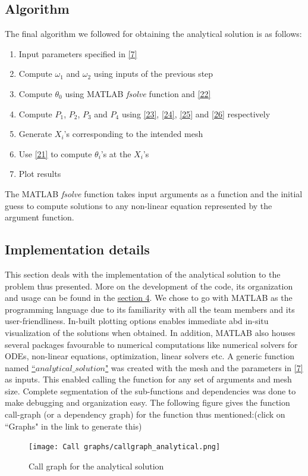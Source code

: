 \documentclass[12pt]{article}
\begin{document}
\subsection{Algorithm }
The final algorithm we followed for obtaining the analytical solution is as follows:
\begin{enumerate}
    \item Input parameters specified in \eqref{7}
    \item Compute $\omega_1$ and $\omega_2$ using inputs of the previous step
    \item Compute $\theta_0$ using MATLAB \emph{fsolve} function and \eqref{22}
    \item Compute $P_1$, $P_2$, $P_3$ and $P_4$ using \eqref{23}, \eqref{24}, \eqref{25} and \eqref{26} respectively
    \item Generate $X_i$'s corresponding to the intended mesh
    \item Use \eqref{21} to compute $\theta_i$'s at the $X_i$'s 
    \item Plot results
\end{enumerate}
The MATLAB \emph{fsolve} function takes input arguments as a function and the initial guess to compute solutions to any non-linear equation represented by the argument function. 
\subsection{Implementation details}
This section deals with the implementation of the analytical solution to the problem thus presented. More on the development of the code, its organization and usage can be found in the \hyperref[sec:Code]{section 4}. We chose to go with MATLAB as the programming language due to its familiarity with all the team members and its user-friendliness. In-built plotting options enables immediate abd in-situ visualization of the solutions when obtained. In addition, MATLAB also houses several packages favourable to numerical computations like numerical solvers for ODEs, non-linear equations, optimization, linear solvers etc. A generic function named \href{https://rsuryanarayan.github.io/CFD_Documentation/}{``$analytical\_solution$"} was created with the mesh and the parameters in \eqref{7} as inputs. This enabled calling the function for any set of arguments and mesh size. Complete segmentation of the sub-functions and dependencies was done to make debugging and organization easy. The following figure gives the function call-graph (or a dependency graph) for the function thus mentioned:(click on ``Graphs" in the link to generate this)
\begin{figure}[H]
    \centering
    \texttt{[image: Call graphs/callgraph\_analytical.png]}
    \caption{Call graph for the analytical solution}
    \label{fig:2}
\end{figure}
\end{document}
